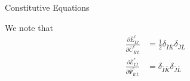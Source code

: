 \documentclass[11pt]{beamer}
\begin{document}
\begin{frame}{Constitutive Equations}

We note that
\begin{align*}
\frac{\partial \bar{E}_{\bar{I}\bar{J}}^e}{\partial \bar{C}_{\bar{K}\bar{L}}^e} &= \frac{1}{2}\delta_{\bar{I}\bar{K}}\delta_{\bar{J}\bar{L}}\\
\frac{\partial \bar{\mathcal{E}}_{\bar{I}\bar{J}}^e}{\partial \bar{\Psi}_{\bar{K}\bar{L}}^e} &= \delta_{\bar{I}\bar{K}}\delta_{\bar{J}\bar{L}}\\
\end{align*}

\end{frame}

%
%
%
%
\end{document}
